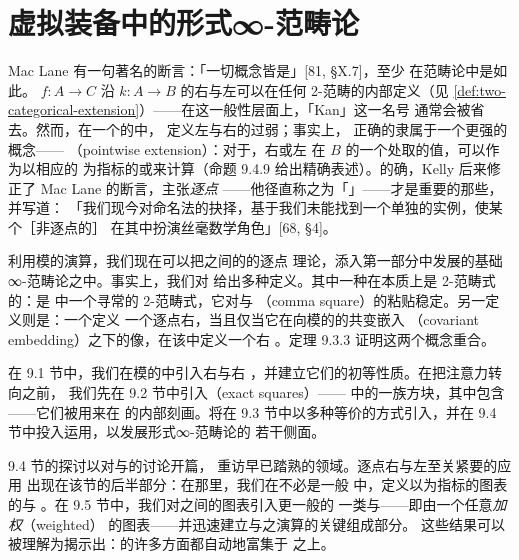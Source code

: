 \chapter{虚拟装备中的形式∞-范畴论}\label{ch:formal-infinity-category-theory}


Mac Lane 有一句著名的断言：「一切概念皆是\trKanExtension」[81, \S X.7]，至少
在范畴论中是如此。\trFunctor{} $f\colon A\to C$ 沿\trFunctor{} $k\colon A\to B$
的右\trExtension{}与左\trExtension{}可以在任何 2-范畴的内部定义（见%
\cref{def:two-categorical-extension}）——在这一般性层面上，「Kan」这一名号
通常会被省去。然而，在一个\trInfinityCosmos{}的\trHomotopyTwoCategory{}中，
定义左\trExtension{}与右\trExtension{}的\trUniversalProperty{}过弱；事实上，
正确的\trUniversalProperty{}隶属于一个更强的概念——\emph{\trPointwiseExtension}
（pointwise extension）：对于\trPointwiseExtension，右\trExtension{}或左%
\trExtension{}在 $B$ 的一个\trElement{}处取的值，可以作为以相应的%
\trCommaInfinityCategory{}为指标的\trLimit{}或\trColimit{}来计算（命题 9.4.9
给出精确表述）。的确，Kelly 后来修正了 Mac Lane 的断言，主张\emph{逐点%
\trKanExtension}——他径直称之为「\trKanExtension」——才是重要的那些，并写道：
「我们现今对命名法的抉择，基于我们未能找到一个单独的实例，使某个［非逐点的］%
\trKanExtension{}在其中扮演丝毫数学角色」[68, \S 4]。

利用模的演算，我们现在可以把\trInfinityCategories{}之间的\trFunctor{}的逐点%
\trKanExtension{}理论，添入第一部分中发展的基础∞-范畴论之中。事实上，我们对%
\trPointwiseExtension{}给出多种定义。其中一种在本质上是 2-范畴式的：\trPointwiseExtension{}是%
\trHomotopyTwoCategory{}中一个寻常的 2-范畴式\trExtension，它对与\trCommaSquare
（comma square）的粘贴稳定。另一定义则是：一个\trNaturalTransformation{}定义
一个逐点右\trExtension{}，当且仅当它在向模的\trVirtualEquipment{}的共变嵌入
（covariant embedding）之下的像，在该\trVirtualEquipment{}中定义一个右%
\trExtension。定理 9.3.3 证明这两个概念重合。

在 9.1 节中，我们在模的\trVirtualEquipment{}中引入右\trLifting{}与右%
\trExtension，并建立它们的初等性质。在把注意力转向\trPointwiseExtension{}之前，
我们先在 9.2 节中引入\emph{\trExactSquare}（exact squares）——%
\trHomotopyTwoCategory{}中的一族方块，其中包含\trCommaSquare——它们被用来在%
\trHomotopyTwoCategory{}的内部刻画\trPointwiseExtension。\trPointwiseExtension{}将在
9.3 节中以多种等价的方式引入，并在 9.4 节中投入运用，以发展形式∞-范畴论的
若干侧面。

9.4 节的探讨以对\trAdjunction{}与\trFullyFaithful{}\trFunctor{}的讨论开篇，
重访早已踏熟的领域。逐点右\trExtension{}与左\trExtension{}至关紧要的应用
出现在该节的后半部分：在那里，我们在不必是\trCartesianClosed{}一般%
\trInfinityCosmos{}中，定义以\trInfinityCategory{}为指标的图表的\trLimit{}与%
\trColimit。在 9.5 节中，我们对\trInfinityCategories{}之间的图表引入更一般的
一类\trLimit{}与\trColimit{}——即由一个任意\trModule{}\emph{加权}（weighted）
的图表——并迅速建立\trWeightedLimit{}与\trWeightedColimit{}之演算的关键组成部分。
这些结果可以被理解为揭示出：\trInfinityCategories{}的许多方面都自动地富集于%
\trDiscrete{}\trInfinityCategories{}之上。

